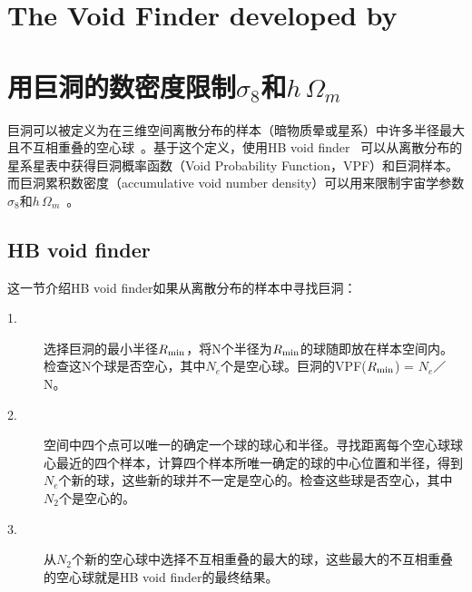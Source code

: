 \section{The Void Finder developed by \cite{El-Ad1997}}



\section{用巨洞的数密度限制$\sigma_8$和$h\, \Omega_m$}

巨洞可以被定义为在三维空间离散分布的样本（暗物质晕或星系）中许多半径最大且不互相重叠的空心球~\cite{Patiri2006HB,BPP09}。基于这个定义，使用HB void finder~\cite{Patiri2006HB} 可以从离散分布的星系星表中获得巨洞概率函数（Void Probability Function，VPF）和巨洞样本。而巨洞累积数密度（accumulative void number density）可以用来限制宇宙学参数$\sigma_8$和$h\, \Omega_m$~\cite{BPP09}。

\subsection{HB void finder}
\label{sec:hb}

这一节介绍HB void finder如果从离散分布的样本中寻找巨洞：
\begin{description}
\item[1.] 选择巨洞的最小半径$R_{\rm min}$，将N个半径为$R_{\rm min}$的球随即放在样本空间内。检查这N个球是否空心，其中$N_e$个是空心球。巨洞的VPF($R_{\rm min}$) = $N_e$／N。
\item[2.] 空间中四个点可以唯一的确定一个球的球心和半径。寻找距离每个空心球球心最近的四个样本，计算四个样本所唯一确定的球的中心位置和半径，得到$N_e$个新的球，这些新的球并不一定是空心的。检查这些球是否空心，其中$N_{2}$个是空心的。
\item[3.] 从$N_{2}$个新的空心球中选择不互相重叠的最大的球，这些最大的不互相重叠的空心球就是HB void finder的最终结果。
\end{description}


